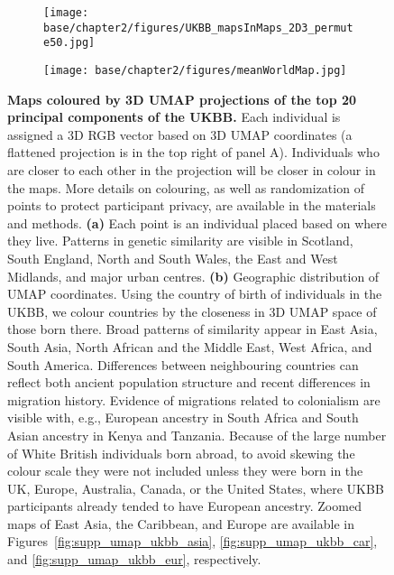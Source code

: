\begin{figure}[h!]
  \centering
  \begin{subfigure}[b]{0.4\linewidth}
    \texttt{[image: base/chapter2/figures/UKBB\_mapsInMaps\_2D3\_permute50.jpg]}
    \caption{}
    \label{fig:umap_ukbb_geo_map}
  \end{subfigure}
  \begin{subfigure}[b]{0.4\linewidth}
    \texttt{[image: base/chapter2/figures/meanWorldMap.jpg]}
    \caption{}
  \label{fig:umap_world_map}
  \end{subfigure}
  \caption[Maps coloured by 3D UMAP projections]{\textbf{Maps coloured by 3D UMAP projections of the top 20 principal components of the UKBB.} Each individual is assigned a 3D RGB vector based on 3D UMAP coordinates (a flattened projection is in the top right of panel A). Individuals who are closer to each other in the projection will be closer in colour in the maps. More details on colouring, as well as randomization of points to protect participant privacy, are available in the materials and methods. \textbf{(a)} Each point is an individual placed based on where they live. Patterns in genetic similarity are visible in Scotland, South England, North and South Wales, the East and West Midlands, and major urban centres. \textbf{(b)} Geographic distribution of UMAP coordinates. Using the country of birth of individuals in the UKBB, we colour countries by the closeness in 3D UMAP space of those born there. Broad patterns of similarity appear in East Asia, South Asia, North African and the Middle East, West Africa, and South America. Differences between neighbouring countries can reflect both ancient population structure and recent differences in migration history. Evidence of migrations related to colonialism are visible with, e.g., European ancestry in South Africa and South Asian ancestry in Kenya and Tanzania. Because of the large number of White British individuals born abroad, to avoid skewing the colour scale they were not included unless they were born in the UK, Europe, Australia, Canada, or the United States, where UKBB participants already tended to have European ancestry. Zoomed maps of East Asia, the Caribbean, and Europe are available in Figures~\ref{fig:supp_umap_ukbb_asia}, \ref{fig:supp_umap_ukbb_car}, and \ref{fig:supp_umap_ukbb_eur}, respectively.}
  \label{fig:fig5}
\end{figure}

